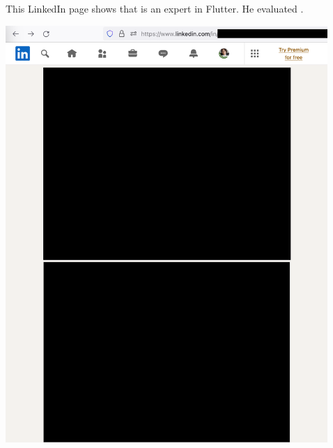 
This LinkedIn page shows that \MrGdeMemberInterviewer is an expert in Flutter.
He evaluated \mrl.

\begin{center}
    \includegraphics[width=33em]{gde-member-interviewer-linkedin-p1_public}
\end{center}
\WillContinue
\pagebreak

